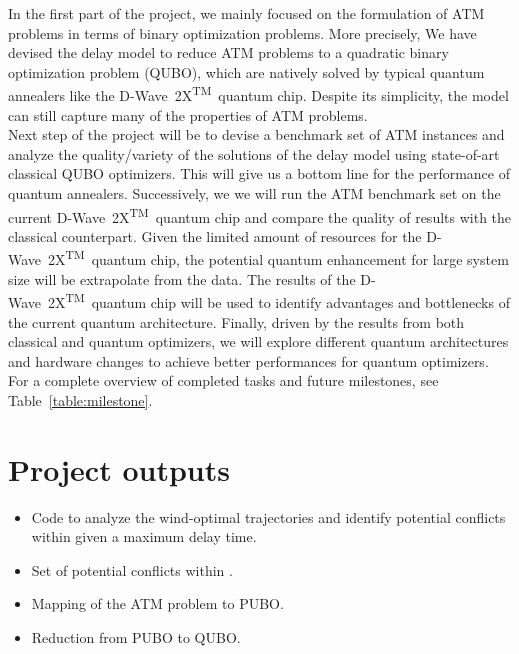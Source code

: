 \documentclass[9pt]{extarticle}
\renewcommand{\tablename}{Table}
\newcommand{\note}[1][]{\added[remark={#1}]}
\newcommand{\DW}{\mbox{D-Wave 2X\textsuperscript{TM}}~}
\begin{document}
In the first part of the project, we mainly focused on the formulation of ATM problems in terms of binary optimization problems. More precisely,
We have devised the delay model to reduce ATM problems to a quadratic binary optimization problem (QUBO), which are natively solved by typical 
quantum annealers like the \DW quantum chip. Despite its simplicity, the model can still capture many of the properties of ATM problems. \\

Next step of the project will be to devise a benchmark set of ATM instances and analyze the quality/variety of the solutions of the delay model using 
state-of-art classical QUBO optimizers. This will give us a bottom line for the performance of quantum annealers. Successively, we 
we will run the ATM benchmark set on the current \DW quantum chip and compare the quality of results with the classical counterpart. Given the limited
amount of resources for the \DW quantum chip, the potential quantum enhancement for large system size will
be extrapolate from the data. The results of the \DW quantum chip will be used to identify advantages and bottlenecks of
the current quantum architecture. Finally, driven by the results from both classical and quantum optimizers, 
we will explore different quantum architectures and hardware changes to achieve better performances for quantum optimizers.\\

For a complete overview of completed tasks and future milestones, see \tablename~\ref{table:milestone}.

\section*{Project outputs}

\begin{itemize}
	\item Code to analyze the wind-optimal trajectories and identify potential conflicts within given a maximum delay time.
	\item Set of potential conflicts within \note[Check]{1 hour maximum}.
	\item Mapping of the ATM problem to PUBO.
	\item Reduction from PUBO to QUBO.
\end{itemize}
\end{document}

